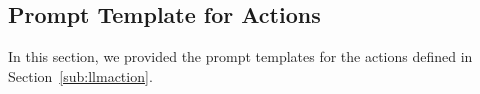 


\newpage
\clearpage

\subsection{Prompt Template for Actions}
\label{sub:action-prompts}

In this section, we provided the prompt templates for the actions defined in Section~\ref{sub:llmaction}. 

